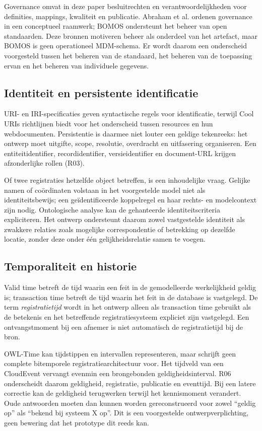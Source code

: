 Governance omvat in deze paper besluitrechten en verantwoordelijkheden voor definities, mappings, kwaliteit en publicatie. Abraham et al. ordenen governance in een conceptueel raamwerk; BOMOS ondersteunt het beheer van open standaarden. \citep{L07,S23} Deze bronnen motiveren beheer als onderdeel van het artefact, maar BOMOS is geen operationeel MDM-schema. Er wordt daarom een onderscheid voorgesteld tussen het beheren van de standaard, het beheren van de toepassing ervan en het beheren van individuele gegevens.

\subsection{Identiteit en persistente identificatie}
URI- en IRI-specificaties geven syntactische regels voor identificatie, terwijl Cool URIs richtlijnen biedt voor het onderscheid tussen resources en hun webdocumenten. \citep{S38,S39} Persistentie is daarmee niet louter een geldige tekenreeks: het ontwerp moet uitgifte, scope, resolutie, overdracht en uitfasering organiseren. Een entiteitidentifier, recordidentifier, versieidentifier en document-URL krijgen afzonderlijke rollen (R03).

Of twee registraties hetzelfde object betreffen, is een inhoudelijke vraag. Gelijke namen of coördinaten volstaan in het voorgestelde model niet als identiteitsbewijs; een geïdentificeerde koppelregel en haar rechts- en modelcontext zijn nodig. Ontologische analyse kan de gehanteerde identiteitscriteria expliciteren. \citep{L08,L10} Het ontwerp ondersteunt daarom zowel vastgestelde identiteit als zwakkere relaties zoals mogelijke correspondentie of betrekking op dezelfde locatie, zonder deze onder één gelijkheidsrelatie samen te voegen.

\subsection{Temporaliteit en historie}
Valid time betreft de tijd waarin een feit in de gemodelleerde werkelijkheid geldig is; transaction time betreft de tijd waarin het feit in de database is vastgelegd. \citep{L14} De term \emph{registratietijd} wordt in het ontwerp alleen als transaction time gebruikt als de betekenis en het betreffende registratiesysteem expliciet zijn vastgelegd. Een ontvangstmoment bij een afnemer is niet automatisch de registratietijd bij de bron.

OWL-Time kan tijdstippen en intervallen representeren, maar schrijft geen complete bitemporele registratiearchitectuur voor. Het tijdveld van een CloudEvent vervangt evenmin een brongebonden geldigheidsinterval. \citep{S37,S22} R06 onderscheidt daarom geldigheid, registratie, publicatie en eventtijd. Bij een latere correctie kan de geldigheid terugwerken terwijl het kennismoment verandert. Oude antwoorden moeten dan kunnen worden gereconstrueerd voor zowel ``geldig op'' als ``bekend bij systeem X op''. Dit is een voorgestelde ontwerpverplichting, geen bewering dat het prototype dit reeds kan.

